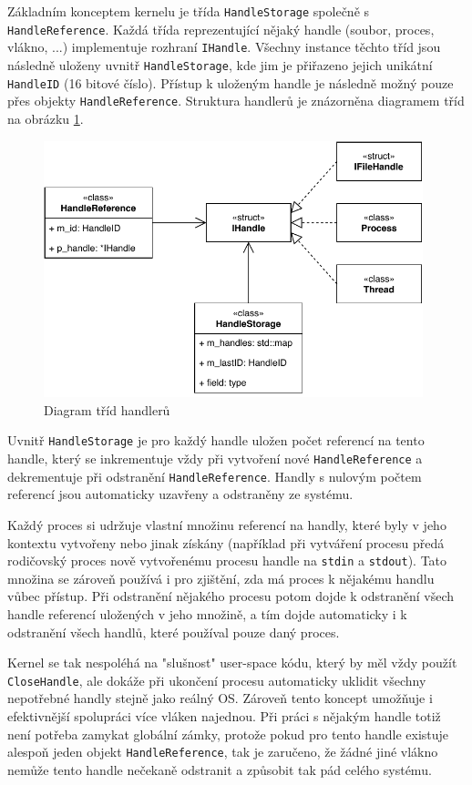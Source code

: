 \documentclass[11pt,a4paper]{scrartcl}
\begin{document}
	Základním konceptem kernelu je třída \verb|HandleStorage| společně s \verb|HandleReference|. Každá třída reprezentující nějaký handle (soubor, proces, vlákno, ...) implementuje rozhraní \verb|IHandle|. Všechny instance těchto tříd jsou následně uloženy uvnitř \verb|HandleStorage|, kde jim je přiřazeno jejich unikátní \verb|HandleID| (16 bitové číslo). Přístup k uloženým handle je následně možný pouze přes objekty \verb|HandleReference|. Struktura handlerů je znázorněna diagramem tříd na obrázku \ref{fig:handle-class-d}.
	
	\begin{figure}[H]
		\centering
		\includegraphics[width=11cm]{handle-class-d.pdf}
		\caption{Diagram tříd handlerů}
		\label{fig:handle-class-d}
	\end{figure}
	
	Uvnitř \verb|HandleStorage| je pro každý handle uložen počet referencí na tento handle, který se inkrementuje vždy při vytvoření nové \verb|HandleReference| a dekrementuje při odstranění \verb|HandleReference|. Handly s nulovým počtem referencí jsou automaticky uzavřeny a odstraněny ze systému. 
	
	Každý proces si udržuje vlastní množinu referencí na handly, které byly v jeho kontextu vytvořeny nebo jinak získány (například při vytváření procesu předá rodičovský proces nově vytvořenému procesu handle na \verb|stdin| a \verb|stdout|). Tato množina se zároveň používá i pro zjištění, zda má proces k nějakému handlu vůbec přístup. Při odstranění nějakého procesu potom dojde k odstranění všech handle referencí uložených v jeho množině, a tím dojde automaticky i k odstranění všech handlů, které používal pouze daný proces. 
	
	Kernel se tak nespoléhá na "slušnost" user-space kódu, který by měl vždy použít \verb|CloseHandle|, ale dokáže při ukončení procesu automaticky uklidit všechny nepotřebné handly stejně jako reálný OS. Zároveň tento koncept umožňuje i efektivnější spolupráci více vláken najednou. Při práci s nějakým handle totiž není potřeba zamykat globální zámky, protože pokud pro tento handle existuje alespoň jeden objekt \verb|HandleReference|, tak je zaručeno, že žádné jiné vlákno nemůže tento handle nečekaně odstranit a způsobit tak pád celého systému.
	
\end{document}

